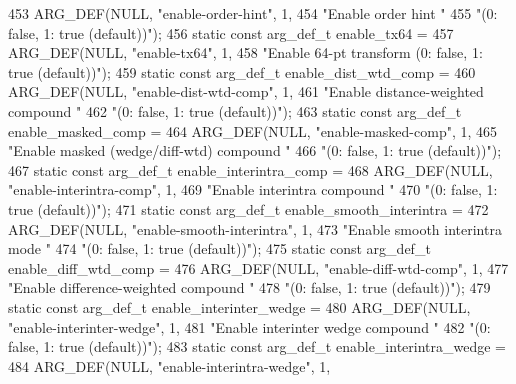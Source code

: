 \begin{DoxyCodeInclude}
{{{{{{{453     ARG\_DEF(NULL, \textcolor{stringliteral}{"enable-order-hint"}, 1,
454             \textcolor{stringliteral}{"Enable order hint "}
455             \textcolor{stringliteral}{"(0: false, 1: true (default))"});
456 \textcolor{keyword}{static} \textcolor{keyword}{const} arg\_def\_t enable\_tx64 =
457     ARG\_DEF(NULL, \textcolor{stringliteral}{"enable-tx64"}, 1,
458             \textcolor{stringliteral}{"Enable 64-pt transform (0: false, 1: true (default))"});
459 \textcolor{keyword}{static} \textcolor{keyword}{const} arg\_def\_t enable\_dist\_wtd\_comp =
460     ARG\_DEF(NULL, \textcolor{stringliteral}{"enable-dist-wtd-comp"}, 1,
461             \textcolor{stringliteral}{"Enable distance-weighted compound "}
462             \textcolor{stringliteral}{"(0: false, 1: true (default))"});
463 \textcolor{keyword}{static} \textcolor{keyword}{const} arg\_def\_t enable\_masked\_comp =
464     ARG\_DEF(NULL, \textcolor{stringliteral}{"enable-masked-comp"}, 1,
465             \textcolor{stringliteral}{"Enable masked (wedge/diff-wtd) compound "}
466             \textcolor{stringliteral}{"(0: false, 1: true (default))"});
467 \textcolor{keyword}{static} \textcolor{keyword}{const} arg\_def\_t enable\_interintra\_comp =
468     ARG\_DEF(NULL, \textcolor{stringliteral}{"enable-interintra-comp"}, 1,
469             \textcolor{stringliteral}{"Enable interintra compound "}
470             \textcolor{stringliteral}{"(0: false, 1: true (default))"});
471 \textcolor{keyword}{static} \textcolor{keyword}{const} arg\_def\_t enable\_smooth\_interintra =
472     ARG\_DEF(NULL, \textcolor{stringliteral}{"enable-smooth-interintra"}, 1,
473             \textcolor{stringliteral}{"Enable smooth interintra mode "}
474             \textcolor{stringliteral}{"(0: false, 1: true (default))"});
475 \textcolor{keyword}{static} \textcolor{keyword}{const} arg\_def\_t enable\_diff\_wtd\_comp =
476     ARG\_DEF(NULL, \textcolor{stringliteral}{"enable-diff-wtd-comp"}, 1,
477             \textcolor{stringliteral}{"Enable difference-weighted compound "}
478             \textcolor{stringliteral}{"(0: false, 1: true (default))"});
479 \textcolor{keyword}{static} \textcolor{keyword}{const} arg\_def\_t enable\_interinter\_wedge =
480     ARG\_DEF(NULL, \textcolor{stringliteral}{"enable-interinter-wedge"}, 1,
481             \textcolor{stringliteral}{"Enable interinter wedge compound "}
482             \textcolor{stringliteral}{"(0: false, 1: true (default))"});
483 \textcolor{keyword}{static} \textcolor{keyword}{const} arg\_def\_t enable\_interintra\_wedge =
484     ARG\_DEF(NULL, \textcolor{stringliteral}{"enable-interintra-wedge"}, 1,
}}}}}}}
\end{DoxyCodeInclude}
